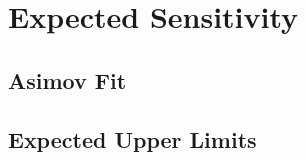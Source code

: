 \chapter{Expected Sensitivity}
\label{chap:Sensitivity}

\section{Asimov Fit}

\section{Expected Upper Limits}

